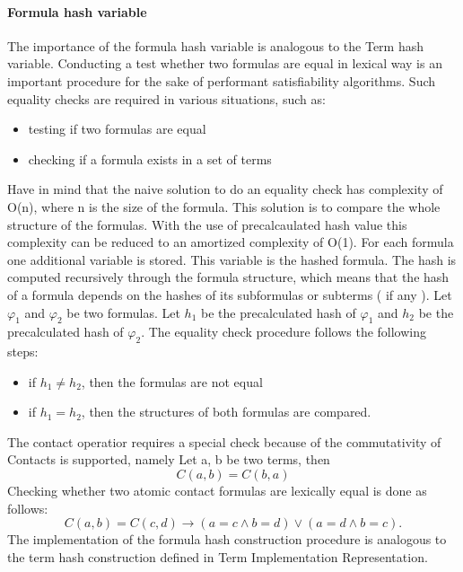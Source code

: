 \documentclass{article}
\begin{document}
	\paragraph{Formula hash variable} 
		The importance of the formula hash variable is analogous to the Term hash variable.
		Conducting a test whether two formulas are equal in lexical way is an important procedure for the sake of performant satisfiability algorithms.
		Such equality checks are required in various situations, such as:
		\begin{itemize}
			\item testing if two formulas are equal
			\item checking if a formula exists in a set of terms
		\end{itemize}
		Have in mind that the naive solution to do an equality check has complexity of O(n), where n is the size of the formula. This solution is to 
		compare the whole structure of the formulas. With the use of precalcaulated hash value this complexity can be reduced to an amortized complexity of O(1).
		For each formula one additional variable is stored. This variable is the hashed formula. The hash is computed recursively through the formula structure, which means 
		that the hash of a formula depends on the hashes of its subformulas or subterms ( if any ).
		Let $\varphi_1$ and $\varphi_2$ be two formulas. Let $h_1$ be the precalculated hash of $\varphi_1$ and $h_2$ be the precalculated hash of $\varphi_2$.
		The equality check procedure follows the following steps:
		\begin{itemize}
			\item if $h_1 \neq h_2$, then the formulas are not equal
			\item if $h_1 = h_2$, then the structures of both formulas are compared.
		\end{itemize}
		\noindent
		\newline
		The contact operatior requires a special check because of the commutativity of Contacts is supported, namely
		\newline
		\newline
		Let a, b be two terms, then
		\begin{equation}
			C(a, b) = C(b, a)
		\end{equation}
		Checking whether two atomic contact formulas are lexically equal is done as follows:
		\begin{equation}
			 C(a, b) = C(c, d) \rightarrow (a = c \wedge b = d) \vee (a = d \wedge b = c).
		\end{equation}
		The implementation of the formula hash construction procedure is analogous to the term hash construction defined in Term Implementation Representation.
\end{document}
